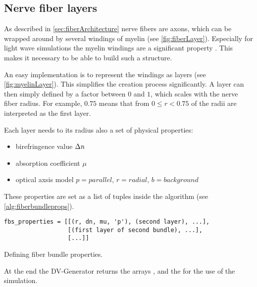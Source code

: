 \subsection{Nerve fiber layers}
%
As described in \cref{sec:fiberArchitecture} nerve fibers are axons, which can be wrapped around by several windings of myelin (see \cref{fig:fiberLayer}).
Especially for light wave simulations the myelin windings are a significant property \cite{MenzelDissertation}.
This makes it necessary to be able to build such a structure.
\par
%
An easy implementation is to represent the windings as layers (see \cref{fig:myelinLayer}).
This simplifies the creation process significantly.
A layer can then simply defined by a factor between $0$ and $1$, which scales with the nerve fiber radius.
For example, $0.75$ means that from $0 \leq r < 0.75$ of the radii are interpreted as the first layer.
\par
%
Each layer needs to its radius also a set of physical properties:
%
\begin{itemize}[nosep]
    \item birefringence value $\textnormal{$\Delta n$}$
    \item absorption coefficient $\mu$
    \item optical axsis model $p=\mathit{parallel}$, $r=\mathit{radial}$, $b=\mathit{background}$
\end{itemize}
%
These properties are set as a list of tuples inside the algorithm (see \cref{alg:fiberbundleprops}).
%
\begin{lstfloat}[!ht]
\lstset{style=python}
\begin{lstlisting}[]
fbs_properties = [[(r, dn, mu, 'p'), (second layer), ...],
                  [(first layer of second bundle), ...],
                  [...]]
\end{lstlisting}
\caption[Fiber bundle properties]{Defining fiber bundle properties.}
\label{alg:fiberbundleprops}
\end{lstfloat}
%
At the end the DV-Generator returns the arrays \tissue{}, \opticalaxis{} and the \propertylist{} for the use of the simulation.
%
